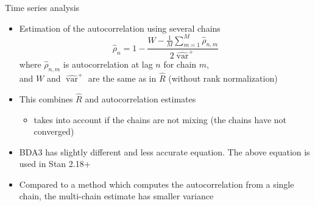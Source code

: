 \documentclass[finnish,english,t]{beamer}
\DeclareMathOperator{\var}{var}
\begin{document}
\begin{frame}{Time series analysis}

  \begin{itemize}
  \item Estimation of the autocorrelation using several chains
    \begin{equation*}
      \hat{\rho}_n=1-\frac{W - \frac{1}{M}\sum_{m=1}^M \hat{\rho}_{n,m}}{2\widehat{\var}^{+}}
    \end{equation*}
    where $\hat{\rho}_{n,m}$ is autocorrelation at lag $n$ for chain
    $m$,\\ and $W$ and $\widehat{\var}^{+}$ are the same as in
    $\widehat{R}$ (without rank normalization)
  \item<2-> This combines $\widehat{R}$ and autocorrelation estimates
    \begin{itemize}
    \item takes into account if the chains are not mixing (the chains have not converged)
    \end{itemize}
  \item<3-> BDA3 has slightly different and less accurate equation. The
    above equation is used in Stan 2.18+
  \item<4-> Compared to a method which computes the autocorrelation
    from a single chain, the multi-chain estimate has smaller variance
 \end{itemize}
\end{frame}
\end{document}
